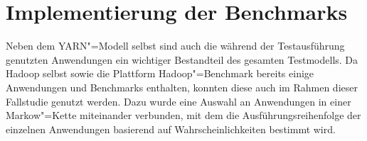 \chapter{Implementierung der Benchmarks}
\label{ch:benchmarks}

Neben dem \ac{YARN}"=Modell selbst sind auch die während der Testausführung genutzten Anwendungen ein wichtiger Bestandteil des gesamten Testmodells.
Da Hadoop selbst sowie die Plattform Hadoop"=Benchmark bereits einige Anwendungen und Benchmarks enthalten, konnten diese auch im Rahmen dieser Fallstudie genutzt werden.
Dazu wurde eine Auswahl an Anwendungen in einer Markow"=Kette miteinander verbunden, mit dem die Ausführungsreihenfolge der einzelnen Anwendungen basierend auf Wahrscheinlichkeiten bestimmt wird.





